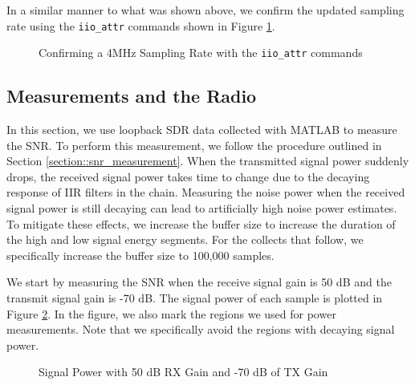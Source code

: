\documentclass{article}
\begin{document}
In a similar manner to what was shown above, we confirm the updated sampling rate using the \texttt{iio\_attr} commands shown in Figure \ref{fig::iio_attr_confirm_sampling_rate}.

\begin{figure}[H]
	\centerline{}
	\caption{Confirming a 4MHz Sampling Rate with the \texttt{iio\_attr} commands}
	\label{fig::iio_attr_confirm_sampling_rate}
\end{figure}

\subsection{Measurements and the Radio}

In this section, we use loopback SDR data collected with MATLAB to measure the SNR. To perform this measurement, we follow the procedure outlined in Section \ref{section::snr_measurement}. When the transmitted signal power suddenly drops, the received signal power takes time to change due to the decaying response of IIR filters in the chain. Measuring the noise power when the received signal power is still decaying can lead to artificially high noise power estimates. To mitigate these effects, we increase the buffer size to increase the duration of the high and low signal energy segments. For the collects that follow, we specifically increase the buffer size to 100,000 samples.

We start by measuring the SNR when the receive signal gain is 50 dB and the transmit signal gain is -70 dB. The signal power of each sample is plotted in Figure \ref{fig::snr_manual_agc_50db_rx_gain_70db_tx_atten}. In the figure, we also mark the regions we used for power measurements. Note that we specifically avoid the regions with decaying signal power.

\begin{figure}[H]
	\centerline{}
	\caption{Signal Power with 50 dB RX Gain and -70 dB of TX Gain}
	\label{fig::snr_manual_agc_50db_rx_gain_70db_tx_atten}
\end{figure}
\end{document}
